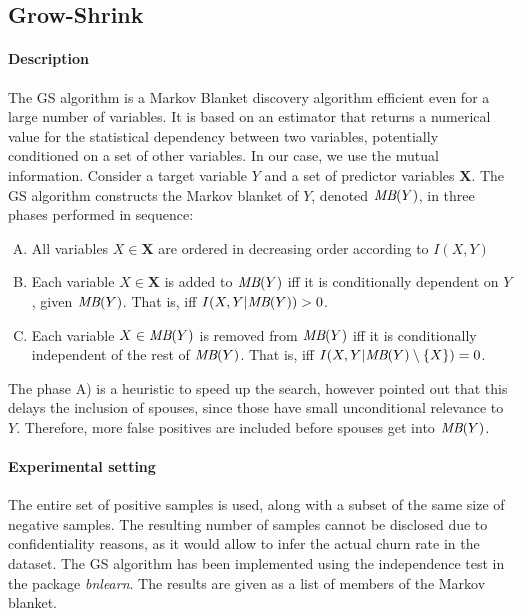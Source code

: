 \subsection{Grow-Shrink}

\paragraph{Description} The GS algorithm \parencite{margaritis2000bayesian} is a
Markov Blanket discovery algorithm efficient even for a large number of
variables. It is based on an estimator that returns a numerical value for the
statistical dependency between two variables, potentially conditioned on a set
of other variables. In our case, we use the mutual information. Consider a
target variable $Y$ and a set of predictor variables $\bm X$. The GS algorithm
constructs the Markov blanket of $Y$, denoted $\textit{MB}(Y)$, in three phases
performed in sequence:

\begin{enumerate}[A)]
    \item All variables $X\in\bm X$ are ordered in decreasing order according to
    $I(X, Y)$
    \item Each variable $X\in\bm X$ is added to $\textit{MB}(Y)$ iff it is
    conditionally dependent on $Y$, given $\textit{MB}(Y)$. That is, iff $I(X,
    Y|\textit{MB}(Y)) > 0$.
    \item Each variable $X\in\textit{MB}(Y)$ is removed from $\textit{MB}(Y)$
    iff it is conditionally independent of the rest of $\textit{MB}(Y)$. That
    is, iff $I(X, Y|\textit{MB}(Y)\setminus\{X\}) = 0$.
\end{enumerate}

The phase A) is a heuristic to speed up the search, however
\textcite{tsamardinos2003algorithms} pointed out that this delays the inclusion
of spouses, since those have small unconditional relevance to $Y$. Therefore,
more false positives are included before spouses get into $\textit{MB}(Y)$.

\paragraph{Experimental setting} The entire set of positive samples is used,
along with a subset of the same size of negative samples. The resulting number
of samples cannot be disclosed due to confidentiality reasons, as it would allow
to infer the actual churn rate in the dataset. The GS algorithm has been
implemented using the independence test in the package \emph{bnlearn}. The
results are given as a list of members of the Markov blanket.


